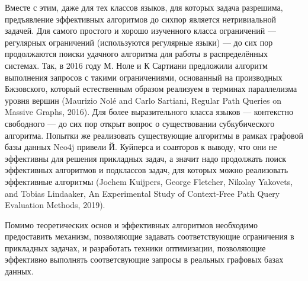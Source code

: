 \documentclass[12pt]{article}  %
\theoremstyle{remark}
\begin{document}
Вместе с этим, даже для тех классов языков, для которых задача разрешима, предъявление эффективных алгоритмов до сихпор является нетривиальной задачей.
Для самого простого и хорошо изученного класса ограничений --- регулярных ограничений (используются регулярные языки) --- до сих пор продолжаются поиски удачного алгоритма для работы в распределённых системах.
Так, в 2016 году М. Ноле и К Сартиани предложили алгоритм выполнения запросов с такими ограничениями, основанный на производных Бжзовского, который естественным образом реализуем в терминах параллелизма уровня вершин (Maurizio Nolé and Carlo Sartiani, Regular Path Queries on Massive Graphs, 2016).
Для более выразительного класса языков --- контекстно свободного --- до сих пор открыт вопрос о существовании субкубического алгоритма.
Попытки же реализовать существующие алгоритмы в рамках графовой базы данных  Neo4j привели Й. Куйперса и соавторов к выводу, что они не эффективны для решения прикладных задач, а значит надо продолжать поиск эффективных алгоритмов и подклассов задач, для которых можно реализовать эффективные алгоритмы (Jochem Kuijpers, George Fletcher, Nikolay Yakovets, and Tobias Lindaaker, An Experimental Study of Context-Free Path Query Evaluation Methods,  2019).

Помимо теоретических основ и эффективных алгоритмов необходимо предоставить механизм, позволяющие задавать соответствующие ограничения в прикладных задачах, и разработать техники оптимизации, позволяющие эффективно выполнять соответсвующие запросы в реальных графовых базах данных.
\end{document}
